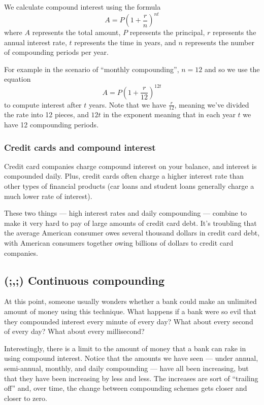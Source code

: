 \begin{boxdef}
We calculate compound interest using the formula \[A = P\left(1+\frac{r}{n}\right)^{nt}\]
where $A$ represents the total amount, $P$ represents the principal, $r$ represents the annual interest rate, $t$ represents the time in years, and $n$ represents the number of compounding periods per year.
\end{boxdef}

For example in the scenario of ``monthly compounding'', $n=12$ and so we use the equation \[A = P\left( 1 + \frac{r}{12}\right)^{12t}\] to compute interest after $t$ years. Note that we have $\frac{r}{12}$, meaning we've divided the rate into 12 pieces, and $12t$ in the exponent meaning that in each year $t$ we have 12 compounding periods.

\subsubsection{Credit cards and compound interest}
	
Credit card companies charge compound interest on your balance, and interest is compounded daily. Plus, credit cards often charge a higher interest rate than other types of financial products (car loans and student loans generally charge a much lower rate of interest).

These two things --- high interest rates and daily compounding --- combine to make it very hard to pay of large amounts of credit card debt. It's troubling that the average American consumer owes several thousand dollars in credit card debt, with American consumers together owing billions of dollars to credit card companies.


\subsection{(;,;) Continuous compounding}

At this point, someone usually wonders whether a bank could make an unlimited amount of money using this technique. What happens if a bank were so evil that they compounded interest every minute of every day? What about every second of every day? What about every millisecond?

Interestingly, there is a limit to the amount of money that a bank can rake in using compound interest. Notice that the amounts we have seen --- under annual, semi-annual, monthly, and daily compounding --- have all been increasing, but that they have been increasing by less and less. The increases are sort of ``trailing off'' and, over time, the change between compounding schemes gets closer and closer to zero.

